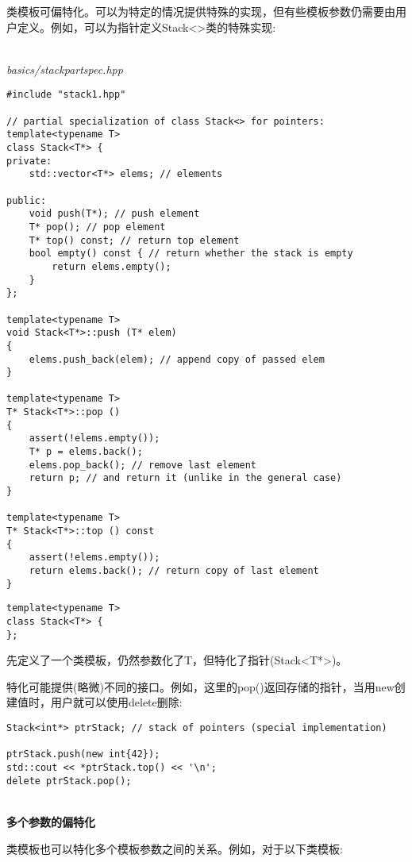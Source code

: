 类模板可偏特化。可以为特定的情况提供特殊的实现，但有些模板参数仍需要由用户定义。例如，可以为指针定义Stack<>类的特殊实现:

\hspace*{\fill} \\ %
\noindent
\textit{basics/stackpartspec.hpp}
\begin{lstlisting}[style=styleCXX]
#include "stack1.hpp"

// partial specialization of class Stack<> for pointers:
template<typename T>
class Stack<T*> {
private:
	std::vector<T*> elems; // elements
	
public:
	void push(T*); // push element
	T* pop(); // pop element
	T* top() const; // return top element
	bool empty() const { // return whether the stack is empty
		return elems.empty();
	}
};

template<typename T>
void Stack<T*>::push (T* elem)
{
	elems.push_back(elem); // append copy of passed elem
}

template<typename T>
T* Stack<T*>::pop ()
{
	assert(!elems.empty());
	T* p = elems.back();
	elems.pop_back(); // remove last element
	return p; // and return it (unlike in the general case)
}

template<typename T>
T* Stack<T*>::top () const
{
	assert(!elems.empty());
	return elems.back(); // return copy of last element
}
\end{lstlisting}

\begin{lstlisting}[style=styleCXX]
template<typename T>
class Stack<T*> {
};
\end{lstlisting}

先定义了一个类模板，仍然参数化了T，但特化了指针(Stack<T*>)。

特化可能提供(略微)不同的接口。例如，这里的pop()返回存储的指针，当用new创建值时，用户就可以使用delete删除:

\begin{lstlisting}[style=styleCXX]
Stack<int*> ptrStack; // stack of pointers (special implementation)

ptrStack.push(new int{42});
std::cout << *ptrStack.top() << '\n';
delete ptrStack.pop();
\end{lstlisting}

\hspace*{\fill} \\ %
\noindent
\textbf{多个参数的偏特化}

类模板也可以特化多个模板参数之间的关系。例如，对于以下类模板:

